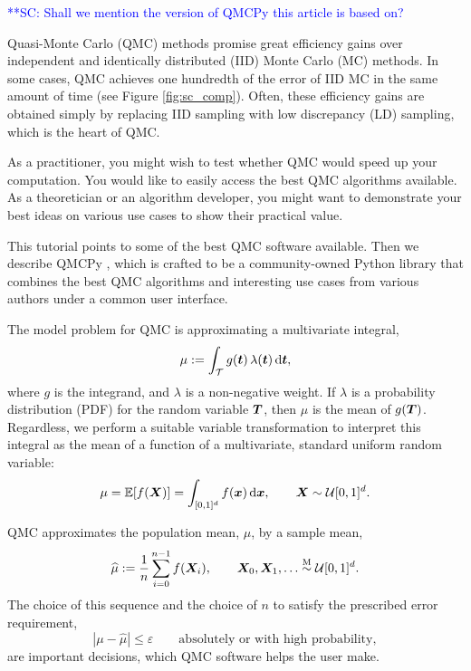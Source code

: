 \documentclass[graybox,footinfo]{svmult}
\newcommand{\QMCPYabs}[1]{\ensuremath{{\left \lvert #1 \right \rvert}}}
\newcommand{\scnote}[1]{ {\textcolor{blue}  {\mbox{**SC:} #1}}}
\newcommand{\hmu}{\widehat{\mu}}
\newcommand{\Msim}{\overset{\textup{M}}{\sim}}
\newcommand{\cube}{[0,1]^d}
\begin{document}
\scnote{Shall we mention the version of QMCPy this article is based on?}

Quasi-Monte Carlo (QMC) methods promise great efficiency gains over independent and identically distributed (IID) Monte Carlo (MC) methods.  In some cases, QMC  achieves one hundredth of the error of IID MC in the same amount of time (see Figure \ref{fig:sc_comp}). Often, these efficiency gains are obtained simply by replacing IID sampling with low discrepancy (LD) sampling, which is the heart of QMC. 

As a practitioner, you might wish to test whether QMC would speed up your computation.  You would like to easily access the best QMC algorithms available.  As a theoretician or an algorithm developer, you might want to demonstrate your best ideas on  various  use cases to show their practical value.  

This tutorial points to some of the best QMC software available.  Then we describe  QMCPy \cite{QMCPy2020a}, which is crafted to be a community-owned Python library that combines the best QMC algorithms and interesting use cases from various authors under a common user interface.

The model problem for QMC is approximating a multivariate integral,
\begin{equation} \label{eq:integral}
	\mu := \int_\calT g(\bst) \, \lambda(\bst) \, \D \bst,
\end{equation}
where $g$ is the integrand, and $\lambda$ is a non-negative weight.  If $\lambda$ is a probability distribution (PDF) for the random variable ${\boldsymbol{T}}$, then $\mu$ is the mean of $g({\boldsymbol{T}})$.  Regardless, we perform a suitable variable transformation to interpret this integral as the  mean of a function of a multivariate, standard uniform random variable:
\begin{equation} \label{eq:fintegral}
	\mu = \bbE[f(\bsX)] =  \int_{\cube}  f(\bsx) \,  \D \bsx , \qquad \bsX \sim \calU\cube.
\end{equation}

QMC approximates the population mean, $\mu$,  by a sample mean,
\begin{equation} \label{eq:samplemean}
	\hmu := \frac 1n \sum_{i=0}^{n-1} f(\bsX_i), \qquad \bsX_0, \bsX_1, \ldots \Msim \calU\cube.
\end{equation}
The choice of this sequence and the choice of $n$ to satisfy  the prescribed error requirement,
\begin{equation} \label{eq:err_req}
	\QMCPYabs{\mu - \hmu} \le \varepsilon \qquad \text{absolutely or with high probability},
\end{equation} 
are important decisions, which  QMC software helps the user make.
\end{document}
